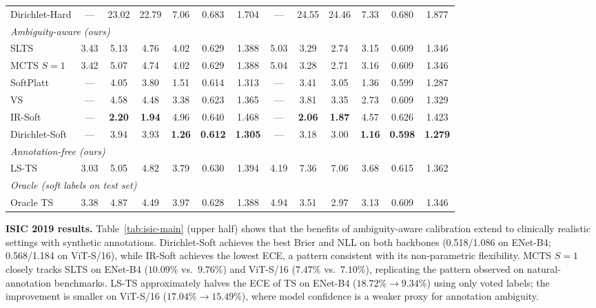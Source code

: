 \documentclass[10pt,journal,compsoc]{IEEEtran}
\begin{document}
\begin{table}[t]
{\begin{tabular}{l cccccc cccccc}
    Dirichlet-Hard & ---  & 23.02 & 22.79 &  7.06 & 0.683 & 1.704  & ---  & 24.55 & 24.46 &  7.33 & 0.680 & 1.877 \\
    \cmidrule(l){1-13}
    \multicolumn{13}{l}{\textit{Ambiguity-aware (ours)}} \\
    SLTS           & 3.43 &  5.13 &  4.76 &  4.02 & 0.629 & 1.388  & 5.03 &  3.29 &  2.74 &  3.15 & 0.609 & 1.346 \\
    MCTS $S{=}1$   & 3.42 &  5.07 &  4.74 &  4.02 & 0.629 & 1.388  & 5.04 &  3.28 &  2.71 &  3.16 & 0.609 & 1.346 \\
    SoftPlatt      & ---  &  4.05 &  3.80 &  1.51 & 0.614 & 1.313  & ---  &  3.41 &  3.05 &  1.36 & 0.599 & 1.287 \\
    VS             & ---  &  4.58 &  4.48 &  3.38 & 0.623 & 1.365  & ---  &  3.81 &  3.35 &  2.73 & 0.609 & 1.329 \\
    IR-Soft        & ---  &  \textbf{2.20} & \textbf{1.94} &  4.96 & 0.640 & 1.468  & ---  &  \textbf{2.06} & \textbf{1.87} &  4.57 & 0.626 & 1.423 \\
    Dirichlet-Soft & ---  &  3.94 &  3.93 &  \textbf{1.26} & \textbf{0.612} & \textbf{1.305}  & ---  &  3.18 &  3.00 &  \textbf{1.16} & \textbf{0.598} & \textbf{1.279} \\
    \cmidrule(l){1-13}
    \multicolumn{13}{l}{\textit{Annotation-free (ours)}} \\
    LS-TS          & 3.03 &  5.05 &  4.82 &  3.79 & 0.630 & 1.394  & 4.19 &  7.36 &  7.06 &  3.68 & 0.615 & 1.362 \\
    \cmidrule(l){1-13}
    \multicolumn{13}{l}{\textit{Oracle (soft labels on test set)}} \\
    Oracle TS      & 3.38 &  4.87 &  4.49 &  3.97 & 0.628 & 1.388  & 4.94 &  3.51 &  2.97 &  3.13 & 0.609 & 1.346 \\
    \bottomrule
  \end{tabular}}
\end{table}

\noindent\textbf{ISIC 2019 results.}
Table~\ref{tab:isic-main} (upper half) shows that the benefits of ambiguity-aware calibration extend to clinically realistic settings with synthetic annotations.  Dirichlet-Soft achieves the best Brier and NLL on both backbones (0.518/1.086 on ENet-B4; 0.568/1.184 on ViT-S/16), while IR-Soft achieves the lowest ECE, a pattern consistent with its non-parametric flexibility.  MCTS $S{=}1$ closely tracks SLTS on ENet-B4 ($10.09\%$ vs.\ $9.76\%$) and ViT-S/16 ($7.47\%$ vs.\ $7.10\%$), replicating the pattern observed on natural-annotation benchmarks.  LS-TS approximately halves the ECE of TS on ENet-B4 ($18.72\%\to9.34\%$) using only voted labels; the improvement is smaller on ViT-S/16 ($17.04\%\to15.49\%$), where model confidence is a weaker proxy for annotation ambiguity.
\end{document}
